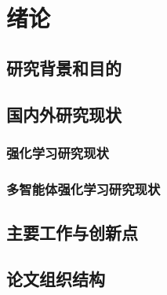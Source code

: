 
\chapter{绪论}
\section{研究背景和目的}

\section{国内外研究现状}
\subsection{强化学习研究现状}

\subsection{多智能体强化学习研究现状}

\section{主要工作与创新点}

\section{论文组织结构}